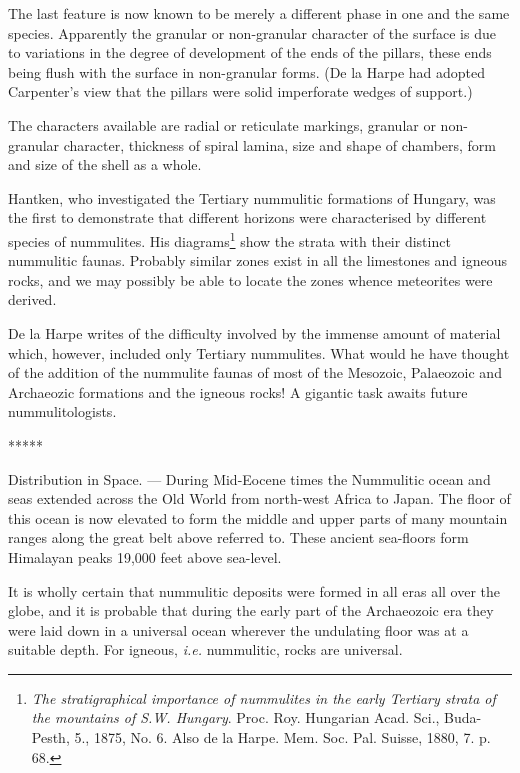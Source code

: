 \documentclass[a4paper, 12pt, oneside, landscape]{article}
\begin{document}
The last feature is now known to be merely a different phase in one and the same species. Apparently the granular or non-granular character of the surface is due to variations in the degree of development of the ends of the pillars, these ends being flush with the surface in non-granular forms. (De la Harpe had adopted Carpenter's view that the pillars were solid imperforate wedges of support.)

The characters available are radial or reticulate markings, granular or non-granular character, thickness of spiral lamina, size and shape of chambers, form and size of the shell as a whole.

Hantken, who investigated the Tertiary nummulitic formations of Hungary, was the first to demonstrate that different horizons were characterised by different species of nummulites. His diagrams\footnote{\emph{The stratigraphical importance of nummulites in the early Tertiary strata of the mountains of S.W. Hungary}. Proc. Roy. Hungarian Acad. Sci., Buda-Pesth, 5., 1875, No. 6. Also de la Harpe. Mem. Soc. Pal. Suisse, 1880, 7. p. 68.} show the strata with their distinct nummulitic faunas. Probably similar zones exist in all the limestones and igneous rocks, and we may possibly be able to locate the zones whence meteorites were derived.

De la Harpe writes of the difficulty involved by the immense amount of material which, however, included only Tertiary nummulites. What would he have thought of the addition of the nummulite faunas of most of the Mesozoic, Palaeozoic and Archaeozic formations and the igneous rocks! A gigantic task awaits future nummulitologists.

\centerline{*\hspace{15mm}*\hspace{15mm}*\hspace{15mm}*\hspace{15mm}*}
\bigskip

Distribution in Space. --- During Mid-Eocene times the Nummulitic ocean and seas extended across the Old World from north-west Africa to Japan. The floor of this ocean is now elevated to form the middle and upper parts of many mountain ranges along the great belt above referred to. These ancient sea-floors form Himalayan peaks 19,000 feet above sea-level.

It is wholly certain that nummulitic deposits were formed in all eras all over the globe, and it is probable that during the early part of the Archaeozoic era they were laid down in a universal ocean wherever the undulating floor was at a suitable depth. For igneous, \emph{i.e.} nummulitic, rocks are universal.
\end{document}
